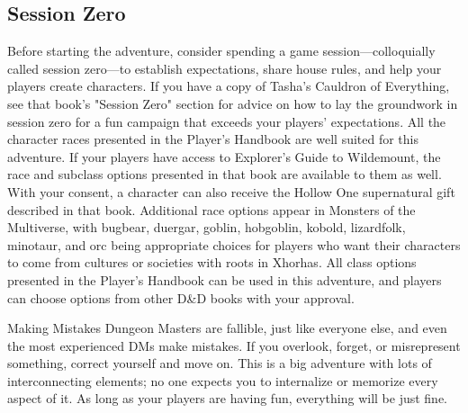 \documentclass[10pt,a4,twoside,twocolumn,openany,nodeprecatedcode]{dndbook}
\begin{document}
\subsection{Session Zero}
Before starting the adventure, consider spending a game session—colloquially called session zero—to establish expectations, share house rules, and help your players create characters. If you have a copy of Tasha's Cauldron of Everything, see that book's "Session Zero" section for advice on how to lay the groundwork in session zero for a fun campaign that exceeds your players' expectations.
All the character races presented in the Player's Handbook are well suited for this adventure. If your players have access to Explorer's Guide to Wildemount, the race and subclass options presented in that book are available to them as well. With your consent, a character can also receive the Hollow One supernatural gift described in that book.
Additional race options appear in Monsters of the Multiverse, with bugbear, duergar, goblin, hobgoblin, kobold, lizardfolk, minotaur, and orc being appropriate choices for players who want their characters to come from cultures or societies with roots in Xhorhas.
All class options presented in the Player's Handbook can be used in this adventure, and players can choose options from other D\&D books with your approval.
\begin{DndComment}{Making Mistakes}
Dungeon Masters are fallible, just like everyone else, and even the most experienced DMs make mistakes. If you overlook, forget, or misrepresent something, correct yourself and move on. This is a big adventure with lots of interconnecting elements; no one expects you to internalize or memorize every aspect of it. As long as your players are having fun, everything will be just fine.
\end{DndComment}
\end{document}
